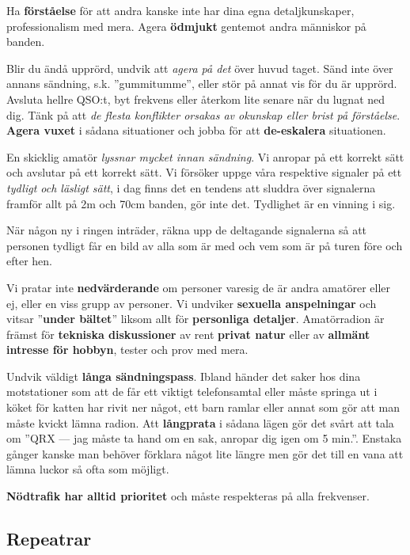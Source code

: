 Ha \textbf{förståelse} för att andra kanske inte har dina egna detaljkunskaper, professionalism med mera. Agera \textbf{ödmjukt} gentemot andra människor på banden.

Blir du ändå upprörd, undvik att \emph{agera på det} över huvud taget. Sänd inte över annans sändning, s.k. ''gummitumme'', eller stör på annat vis för du är upprörd. Avsluta hellre QSO:t, byt frekvens eller återkom lite senare när du lugnat ned dig. Tänk på att \textit{de flesta konflikter orsakas av okunskap eller brist på förståelse}. \textbf{Agera vuxet} i sådana situationer och jobba för att \textbf{de-eskalera} situationen.

En skicklig amatör \textit{lyssnar mycket innan sändning}. Vi anropar på ett korrekt sätt och avslutar på ett korrekt sätt. Vi försöker uppge våra respektive signaler på ett \emph{tydligt och läsligt sätt}, i dag finns det en tendens att sluddra över signalerna framför allt på 2m och 70cm banden, gör inte det. Tydlighet är en vinning i sig. 

När någon ny i ringen inträder, räkna upp de deltagande signalerna så att personen tydligt får en bild av alla som är med och vem som är på turen före och efter hen.

Vi pratar inte \textbf{nedvärderande} om personer varesig de är andra amatörer eller ej, eller en viss grupp av personer. Vi undviker \textbf{sexuella anspelningar} och vitsar ''\textbf{under bältet}'' liksom allt för \textbf{personliga detaljer}. Amatörradion är främst för \textbf{tekniska diskussioner} av rent \textbf{privat natur} eller av \textbf{allmänt intresse för hobbyn}, tester och prov med mera.

Undvik väldigt \textbf{långa sändningspass}. Ibland händer det saker hos dina motstationer som att de får ett viktigt telefonsamtal eller måste springa ut i köket för katten har rivit ner något, ett barn ramlar eller annat som gör att man måste kvickt lämna radion. Att \textbf{långprata} i sådana lägen gör det svårt att tala om ''QRX --- jag måste ta hand om en sak, anropar dig igen om 5 min.''. Enstaka gånger kanske man behöver förklara något lite längre men gör det till en vana att lämna luckor så ofta som möjligt.

\textbf{Nödtrafik har alltid prioritet} och måste respekteras på alla
frekvenser.

\subsection{Repeatrar}

